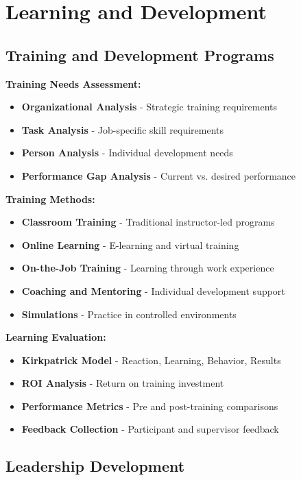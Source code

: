 \documentclass[12pt]{article}
\begin{document}
\section{Learning and Development}

\subsection{Training and Development Programs}

\textbf{Training Needs Assessment:}
\begin{itemize}
    \item \textbf{Organizational Analysis} - Strategic training requirements
    \item \textbf{Task Analysis} - Job-specific skill requirements
    \item \textbf{Person Analysis} - Individual development needs
    \item \textbf{Performance Gap Analysis} - Current vs. desired performance
\end{itemize}

\textbf{Training Methods:}
\begin{itemize}
    \item \textbf{Classroom Training} - Traditional instructor-led programs
    \item \textbf{Online Learning} - E-learning and virtual training
    \item \textbf{On-the-Job Training} - Learning through work experience
    \item \textbf{Coaching and Mentoring} - Individual development support
    \item \textbf{Simulations} - Practice in controlled environments
\end{itemize}

\textbf{Learning Evaluation:}
\begin{itemize}
    \item \textbf{Kirkpatrick Model} - Reaction, Learning, Behavior, Results
    \item \textbf{ROI Analysis} - Return on training investment
    \item \textbf{Performance Metrics} - Pre and post-training comparisons
    \item \textbf{Feedback Collection} - Participant and supervisor feedback
\end{itemize}

\subsection{Leadership Development}
\end{document}
